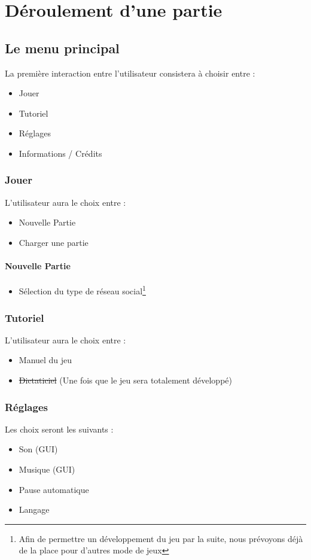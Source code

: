 \chapter{Déroulement d'une partie}
\label{sec:deroulementdUnePartie}

\section{Le menu principal}

La première interaction entre l'utilisateur consistera à choisir entre :

\begin{itemize}
    \item Jouer
    \item Tutoriel
    \item Réglages
    \item Informations / Crédits
\end{itemize}

\subsection{Jouer}
L'utilisateur aura le choix entre :
\begin{itemize}
    \item Nouvelle Partie
    \item Charger une partie
\end{itemize}
\subsubsection{Nouvelle Partie}
\begin{itemize}
    \item Sélection du type de réseau social\footnote{Afin de permettre un développement du jeu par la suite, nous prévoyons déjà de la place pour d'autres mode de jeux}
\end{itemize}

\subsection{Tutoriel}
L'utilisateur aura le choix entre :
\begin{itemize}
    \item Manuel du jeu
    \item \sout{Dictaticiel} (Une fois que le jeu sera totalement développé)
\end{itemize}
\clearpage
\subsection{Réglages}
Les choix seront les suivants :
\begin{itemize}
    \item Son (GUI)
    \item Musique (GUI)
    \item Pause automatique
    \item Langage
\end{itemize}

